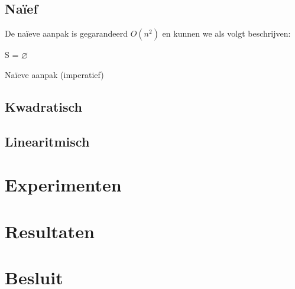 \documentclass[12pt,a4paper]{article}
\begin{document}
\subsection{Na\"ief}
\label{sec:naief}

De naïeve aanpak is gegarandeerd $O(n^2)$ en kunnen we als volgt beschrijven:

\begin{algorithm}[H]
  S = $\varnothing$\;
 \caption{Na\"ieve aanpak (imperatief)}
\end{algorithm}

\subsection{Kwadratisch}
\label{sec:kwadratisch}

\subsection{Linearitmisch}
\label{sec:linearitmisch}


\section{Experimenten}










\section{Resultaten}

\section{Besluit}

\listoftodos
\end{document}
